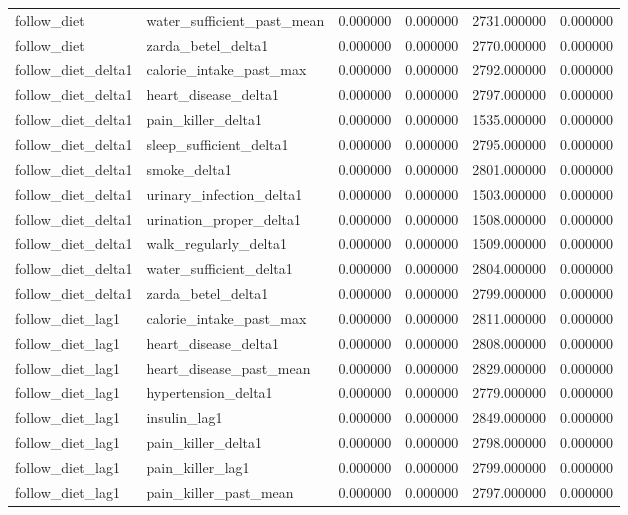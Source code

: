 \begin{longtable}{llrrrr}
follow\_diet & water\_sufficient\_past\_mean & 0.000000 & 0.000000 & 2731.000000 & 0.000000 \\
follow\_diet & zarda\_betel\_delta1 & 0.000000 & 0.000000 & 2770.000000 & 0.000000 \\
follow\_diet\_delta1 & calorie\_intake\_past\_max & 0.000000 & 0.000000 & 2792.000000 & 0.000000 \\
follow\_diet\_delta1 & heart\_disease\_delta1 & 0.000000 & 0.000000 & 2797.000000 & 0.000000 \\
follow\_diet\_delta1 & pain\_killer\_delta1 & 0.000000 & 0.000000 & 1535.000000 & 0.000000 \\
follow\_diet\_delta1 & sleep\_sufficient\_delta1 & 0.000000 & 0.000000 & 2795.000000 & 0.000000 \\
follow\_diet\_delta1 & smoke\_delta1 & 0.000000 & 0.000000 & 2801.000000 & 0.000000 \\
follow\_diet\_delta1 & urinary\_infection\_delta1 & 0.000000 & 0.000000 & 1503.000000 & 0.000000 \\
follow\_diet\_delta1 & urination\_proper\_delta1 & 0.000000 & 0.000000 & 1508.000000 & 0.000000 \\
follow\_diet\_delta1 & walk\_regularly\_delta1 & 0.000000 & 0.000000 & 1509.000000 & 0.000000 \\
follow\_diet\_delta1 & water\_sufficient\_delta1 & 0.000000 & 0.000000 & 2804.000000 & 0.000000 \\
follow\_diet\_delta1 & zarda\_betel\_delta1 & 0.000000 & 0.000000 & 2799.000000 & 0.000000 \\
follow\_diet\_lag1 & calorie\_intake\_past\_max & 0.000000 & 0.000000 & 2811.000000 & 0.000000 \\
follow\_diet\_lag1 & heart\_disease\_delta1 & 0.000000 & 0.000000 & 2808.000000 & 0.000000 \\
follow\_diet\_lag1 & heart\_disease\_past\_mean & 0.000000 & 0.000000 & 2829.000000 & 0.000000 \\
follow\_diet\_lag1 & hypertension\_delta1 & 0.000000 & 0.000000 & 2779.000000 & 0.000000 \\
follow\_diet\_lag1 & insulin\_lag1 & 0.000000 & 0.000000 & 2849.000000 & 0.000000 \\
follow\_diet\_lag1 & pain\_killer\_delta1 & 0.000000 & 0.000000 & 2798.000000 & 0.000000 \\
follow\_diet\_lag1 & pain\_killer\_lag1 & 0.000000 & 0.000000 & 2799.000000 & 0.000000 \\
follow\_diet\_lag1 & pain\_killer\_past\_mean & 0.000000 & 0.000000 & 2797.000000 & 0.000000 \\

\end{longtable}
